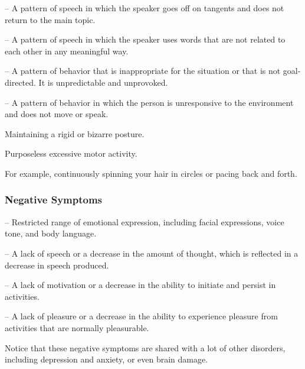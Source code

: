 \begin{coloredlist}
\begin{coloredlist}
        \item {} -- A pattern of speech in which the speaker goes off on tangents and does not return to the main topic.
        \item {} -- A pattern of speech in which the speaker uses words that are not related to each other in any meaningful way.
    \end{coloredlist}
    \item {} -- A pattern of behavior that is inappropriate for the situation or that is not goal-directed. It is unpredictable and unprovoked.
    \item {} -- A pattern of behavior in which the person is unresponsive to the environment and does not move or speak.
    \begin{coloredlist}
        \item Maintaining a rigid or bizarre posture.
        \item Purposeless excessive motor activity.
        \begin{coloredlist}
            \item For example, continuously spinning your hair in circles or pacing back and forth.
        \end{coloredlist}
    \end{coloredlist}
\end{coloredlist}

\subsubsection{Negative Symptoms}

\begin{coloredlist}
    \item {} -- Restricted range of emotional expression, including facial expressions, voice tone, and body language.
    \item {} -- A lack of speech or a decrease in the amount of thought, which is reflected in a decrease in speech produced.
    \item {} -- A lack of motivation or a decrease in the ability to initiate and persist in activities.
    \item {} -- A lack of pleasure or a decrease in the ability to experience pleasure from activities that are normally pleasurable.
    \item Notice that these negative symptoms are shared with a lot of other disorders, including depression and anxiety, or even brain damage.
\end{coloredlist}

